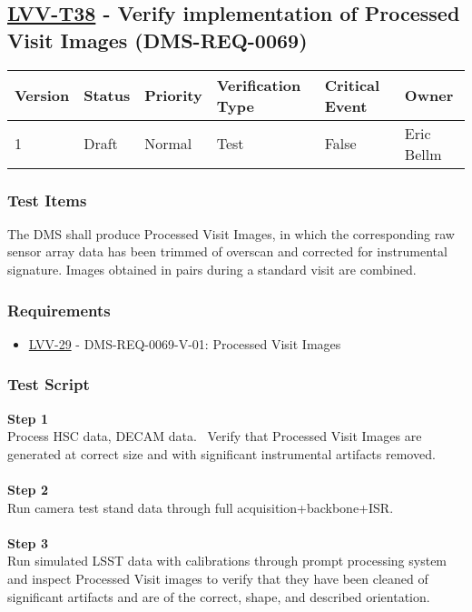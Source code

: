 \hypertarget{lvv-t38---verify-implementation-of-processed-visit-images-dms-req-0069}{%
\subsection{\texorpdfstring{\href{https://jira.lsstcorp.org/secure/Tests.jspa\#/testCase/LVV-T38}{LVV-T38}
- Verify implementation of Processed Visit Images
(DMS-REQ-0069)}{LVV-T38 - Verify implementation of Processed Visit Images (DMS-REQ-0069)}}\label{lvv-t38---verify-implementation-of-processed-visit-images-dms-req-0069}}

\begin{longtable}[]{@{}llllll@{}}
\toprule
Version & Status & Priority & Verification Type & Critical Event &
Owner\tabularnewline
\midrule
\endhead
1 & Draft & Normal & Test & False & Eric Bellm\tabularnewline
\bottomrule
\end{longtable}

\hypertarget{test-items-14}{%
\subsubsection{Test Items}\label{test-items-14}}

The DMS shall produce Processed Visit Images, in which the corresponding
raw sensor array data has been trimmed of overscan and corrected for
instrumental signature. Images obtained in pairs during a standard visit
are combined.

\hypertarget{requirements-15}{%
\subsubsection{Requirements}\label{requirements-15}}

\begin{itemize}
\tightlist
\item
  \href{https://jira.lsstcorp.org/browse/LVV-29}{LVV-29} -
  DMS-REQ-0069-V-01: Processed Visit Images
\end{itemize}

\hypertarget{test-script-15}{%
\subsubsection{Test Script}\label{test-script-15}}

\textbf{Step 1}\\
Process HSC data, DECAM data. ~Verify that Processed Visit Images are
generated at correct size and with significant instrumental artifacts
removed.\\
~\\
\textbf{Step 2}\\
Run camera test stand data through full acquisition+backbone+ISR.\\
~\\
\textbf{Step 3}\\
Run simulated LSST data with calibrations through prompt processing
system and inspect Processed Visit images to verify that they have been
cleaned of significant artifacts and are of the correct, shape, and
described orientation.\\
~\\

